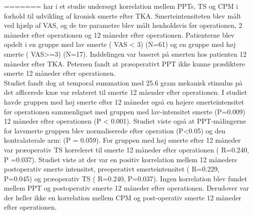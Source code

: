 =======
 har i et studie undersøgt korrelation mellem PPTs, TS og CPM i forhold til udvikling af kronisk smerte efter TKA. Smerteintensiteten blev målt ved hjælp af VAS, og de tre parametre blev målt henholdsvis før operationen, 2 måneder efter operationen og 12 måneder efter operationen. Patienterne blev opdelt i en gruppe med lav smerte ( VAS < 3) (N=61) og en  gruppe med høj smerte ( VAS>=3) (N=17). Inddelingen var baseret på smerten hos patienten 12 måneder efter TKA. Petersen fandt at præoperativt PPT ikke kunne prædiktere smerte 12 måneder efter operationen. \\ %
Studiet fandt dog at temporal summation med 25.6 gram mekanisk stimulus på det afficerede knæ var relateret til smerte 12 måender efter operationen. I studiet havde gruppen med høj smerte efter 12 måneder også en højere smerteintensitet før operationen sammenlignet med gruppen med lav-intensitet smerte (P=0.009) 12 måneder efter operationen (P < 0.001). Studiet viste også at PPT-målingerne for lavsmerte gruppen blev normaliserede efter operation (P<0.05) og den kontralaterale arm: (P = 0.059). For gruppen med høj smerte efter 12 måneder var præoperativ TS korreleret til smerte 12 måneder efter operationen ( R=0.240, P =0.037).
Studiet viste at der var en positiv korrelation mellem 12 måneders postoperativ smerte intensitet, preoperativt smerteintensitet ( R=0.229, P=0.045) og præoperativ TS ( R=0.240, P=0.037). Ingen korrelation blev fundet mellem PPT og postoperativ smerte 12 måneder efter operationen. Derudover var der heller ikke en korrelation mellem CPM og post-operativ smerte 12 måneder efter operationen. 

